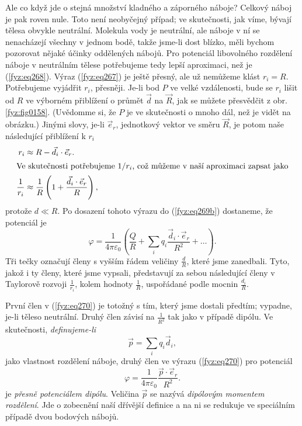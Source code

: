   Ale co když jde o stejná množství kladného a záporného náboje? Celkový náboj je pak roven nule.
  Toto není neobyčejný případ; ve skutečnosti, jak víme, bývají tělesa obvykle neutrální. Molekula
  vody je neutrální, ale náboje v ní se nenacházejí všechny v jednom bodě, takže jsme-li dost
  blízko, měli bychom pozorovat nějaké účinky oddělených nábojů. Pro potenciál libovolného rozdělení
  náboje v neutrálním tělese potřebujeme tedy lepší aproximaci, než je (\ref{fyz:eq268}). Výraz
  (\ref{fyz:eq267}) je ještě přesný, ale už nemůžeme klást \(r_i = R\). Potřebujeme vyjádřit
  \(r_i\), přesněji. Je-li bod \(P\) ve velké vzdálenosti, bude se \(r_i\) lišit od \(R\) ve
  výborném přiblížení o průmět \(\vec{d}\) na \(\vec{R}\), jak se můžete přesvědčit z obr.
  \ref{fyz:fig0158}. (Uvědomme si, že \(P\) je ve skutečnosti o mnoho dál, než je vidět na obrázku.)
  Jinými slovy, je-li \(\vec{e}_r\), jednotkový vektor ve směru \(\vec{R}\), je potom naše
  následující přiblížení k \(r_i\)
  \begin{align}
   r_i &\approx R - \vec{d}_i\cdot\vec{e}_r.  \label{fyz:eq269a} \\
   \shortintertext{Ve skutečnosti potřebujeme \(1/r_i\), což můžeme v naší aproximaci zapsat jako}
   \frac{1}{r_i} 
       &\approx \frac{1}{R}\left(1 +\frac{\vec{d}_i\cdot\vec{e}_r}{R}\right), \label{fyz:eq269b}
  \end{align}
  protože \(d\ll R\). Po dosazení tohoto výrazu do (\ref{fyz:eq269b}) dostaneme, že potenciál je
  \begin{equation}\label{fyz:eq270}
   \varphi = \dfrac{1}{4\pi\varepsilon_0}
             \left(\dfrac{Q}{R} + \sum_i q_i\frac{\vec{d}_i\cdot\vec{e}_r}{R^2} + \ldots\right).
  \end{equation}
  Tři tečky označují členy s vyšším řádem veličiny \(\frac{d}{R}\), které jsme zanedbali. Tyto,
  jakož i ty členy, které jsme vypsali, představují za sebou následující členy v Taylorově rozvoji
  \(\frac{1}{r_i}\), kolem hodnoty \(\frac{1}{R}\), uspořádané podle mocnin \(\frac{d_i}{R}\). 
  
  První člen v (\ref{fyz:eq270}) je totožný s tím, který jsme dostali předtím; vypadne, je-li těleso
  neutrální. Druhý člen závisí na \(\frac{1}{R^2}\) tak jako v případě dipólu. Ve skutečnosti,
  \emph{definujeme-li}
  \begin{equation}\label{fyz:eq271}
    \vec{p} = \sum_i q_i\vec{d}_i,
  \end{equation}
  jako vlastnost rozdělení náboje, druhý člen ve výrazu (\ref{fyz:eq270}) pro potenciál 
  \begin{equation}\label{fyz:eq272}
   \varphi = \dfrac{1}{4\pi\varepsilon_0}\frac{\vec{p}\cdot\vec{e}_r}{R^2}.
  \end{equation}
  je \emph{přesně potenciálem dipólu}. Veličina \(\vec{p}\) se nazývá \emph{dipólovým momentem
  rozdělení}. Jde o zobecnění naší dřívější definice a na ni se redukuje ve speciálním případě dvou
  bodových nábojů. 
  
